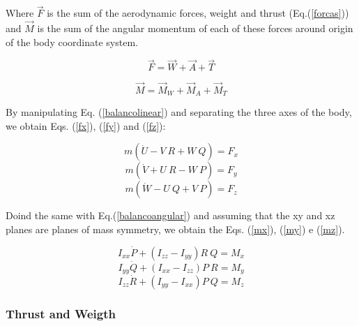 \documentclass[10pt,fleqn,a4paper,twoside]{article}
\begin{document}

Where $ \vec{F} $ is the sum of the aerodynamic forces, weight and thrust (Eq.(\ref{forcas})) and $\vec{M}$ is the sum of the angular momentum of each of these forces around origin of the body coordinate system.



\begin{equation}
\vec{F}=\vec{W}+\vec{A}+\vec{T}
\label{forcas}
\end{equation}

\begin{equation}
\vec{M}=\vec{M}_{W}+\vec{M}_{A}+\vec{M}_{T}
\label{momentos}
\end{equation}


By manipulating Eq. (\ref{balancolinear}) and separating the three axes of the body, we obtain Eqs. (\ref{fx}), (\ref{fy}) and (\ref{fz}):


\begin{equation}
m(\dot{U}-V\ R+W\ Q)=F_{x}
\label{fx}
\end{equation}
\begin{equation}
m(\dot{V}+U\ R-W\ P)=F_{y}
\label{fy}
\end{equation}
\begin{equation}
m(\dot{W}-U\ Q+V\ P)=F_{z}
\label{fz}
\end{equation}

Doind the same with Eq.(\ref{balancoangular}) and assuming that the xy and xz planes are planes of mass symmetry, we obtain the Eqs. (\ref{mx}), (\ref{my}) e (\ref{mz}).

\begin{equation}
I_{xx}\dot{P}+(I_{zz}-I_{yy})R\ Q=M_{x}
\label{mx}
\end{equation}
\begin{equation}
I_{yy}\dot{Q}+(I_{xx}-I_{zz})P\ R=M_{y}
\label{my}
\end{equation}
\begin{equation}
I_{zz}\dot{R}+(I_{yy}-I_{xx})P\ Q=M_{z}
\label{mz}
\end{equation}

\subsubsection{Thrust and Weigth}
\end{document}
